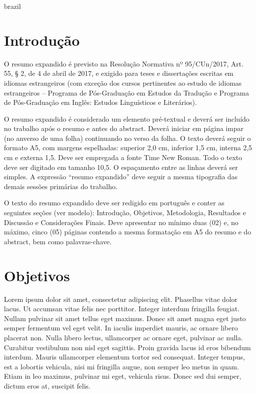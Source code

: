     \begin{otherlanguage*}{brazil}
        \setlength{\parskip}{0.2cm}
        \setlength{\parindent}{0.0cm}
        \selectfont

        \section*{Introdução}
        O resumo expandido é previsto na Resolução Normativa nº 95/CUn/2017, Art. 55, § 2, de 4 de
        abril de 2017, e exigido para teses e dissertações escritas em idiomas estrangeiros (com
        exceção dos cursos pertinentes ao estudo de idiomas estrangeiros – Programa de Pós-Graduação
        em Estudos da Tradução e Programa de Pós-Graduação em Inglês: Estudos Linguísticos e
        Literários).

        O resumo expandido é considerado um elemento pré-textual e deverá ser incluído no trabalho
        após o resumo e antes do abstract. Deverá iniciar em página impar (no anverso de uma folha)
        continuando no verso da folha. O texto deverá seguir o formato A5, com margens espelhadas:
        superior 2,0 cm, inferior 1,5 cm, interna 2,5 cm e externa 1,5. Deve ser empregada a fonte
        Time New Roman.  Todo o texto deve ser digitado em tamanho 10,5. O espaçamento entre as
        linhas deverá ser simples. A expressão “resumo expandido” deve seguir a mesma tipografia das
        demais sessões primárias do trabalho.

        O texto do resumo expandido deve ser redigido em português e conter as seguintes seções (ver
        modelo): Introdução, Objetivos, Metodologia, Resultados e Discussão e Considerações Finais.
        Deve apresentar no mínimo duas (02) e, no máximo, cinco (05) páginas contendo a mesma
        formatação em A5 do resumo e do abstract, bem como palavras-chave. \englishword{\showfont}

        \section*{Objetivos}
        Lorem ipsum dolor sit amet, consectetur adipiscing elit. Phasellus vitae dolor lacus. Ut
        accumsan vitae felis nec porttitor. Integer interdum fringilla feugiat. Nullam pulvinar sit
        amet tellus eget maximus. Donec sit amet magna eget justo semper fermentum vel eget velit.
        In iaculis imperdiet mauris, ac ornare libero placerat non. Nulla libero lectus, ullamcorper
        ac ornare eget, pulvinar ac nulla. Curabitur vestibulum non nisl eget sagittis. Proin
        gravida lacus id eros bibendum interdum. Mauris ullamcorper elementum tortor sed consequat.
        Integer tempus, est a lobortis vehicula, nisi mi fringilla augue, non semper leo metus in
        quam. Etiam in leo maximus, pulvinar mi eget, vehicula risus. Donec sed dui semper, dictum
        eros at, suscipit felis.


\end{otherlanguage*}
